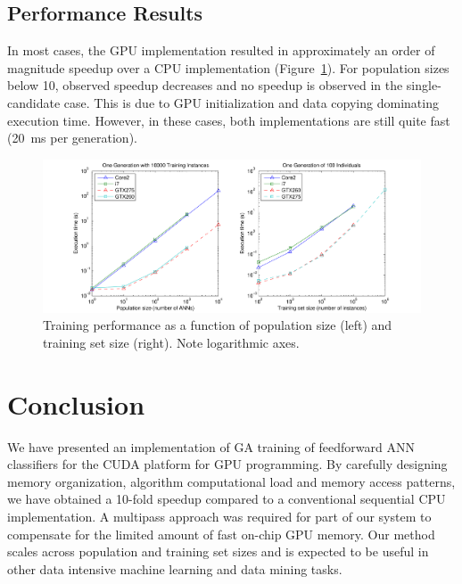 \documentclass[11pt]{article}       %
\begin{document}
\subsection{Performance Results} \label{performance}
In most cases, the GPU implementation resulted in approximately an order of magnitude speedup over a CPU implementation (Figure~\ref{fig:training-performance}). For population sizes below 10, observed speedup decreases and no speedup is observed in the single-candidate case. This is due to GPU initialization and data copying dominating execution time. However, in these cases, both implementations are still quite fast (20~ms per generation).

\begin{figure}[h]
	\centering
	\includegraphics[width=\textwidth]{fig-performance}
	\caption{Training performance as a function of population size (left) and training set size (right). Note logarithmic axes.}
	\label{fig:training-performance}
\end{figure}

\section{Conclusion} \label{concl}
We have presented an implementation of GA training of feedforward ANN classifiers for the CUDA platform for GPU programming. By carefully designing memory organization, algorithm computational load and memory access patterns, we have obtained a 10-fold speedup compared to a conventional sequential CPU implementation. A multipass approach was required for part of our system to compensate for the limited amount of fast on-chip GPU memory. Our method scales across population and training set sizes and is expected to be useful in other data intensive machine learning and data mining tasks.



\end{document}
